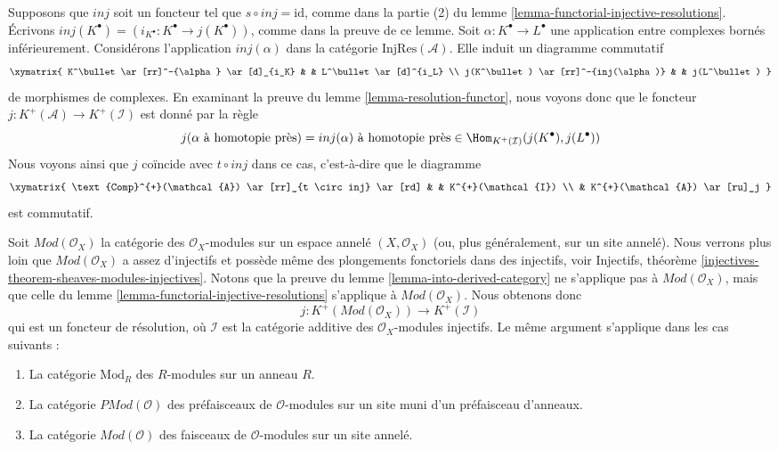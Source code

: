 \begin{remark}
\label{remark-match}
Supposons que $inj$ soit un foncteur tel que $s \circ inj = \text{id}$, comme
dans la partie (2) du lemme
\ref{lemma-functorial-injective-resolutions}.
Écrivons
$inj(K^\bullet) = (i_{K^\bullet} : K^\bullet \to j(K^\bullet))$, comme dans
la preuve de ce lemme.
Soit $\alpha : K^\bullet \to L^\bullet$ une application entre complexes bornés
inférieurement. Considérons l'application $inj(\alpha)$ dans la catégorie
$\text{InjRes}(\mathcal{A})$. Elle induit un diagramme commutatif
$$
\xymatrix{
K^\bullet
\ar[rr]^-{\alpha}
\ar[d]_{i_K} & &
L^\bullet \ar[d]^{i_L} \\
j(K^\bullet)
\ar[rr]^-{inj(\alpha)}
& &
j(L^\bullet)
}
$$
de morphismes de complexes.
En examinant la preuve du lemme \ref{lemma-resolution-functor}, nous voyons
donc que le foncteur
$j : K^{+}(\mathcal{A}) \to K^{+}(\mathcal{I})$ est donné par la règle
$$
j(\alpha\text{ à homotopie près}) =
inj(\alpha)\text{ à homotopie près}\in
\Hom_{K^{+}(\mathcal{I})}(j(K^\bullet), j(L^\bullet))
$$
Nous voyons ainsi que $j$ coïncide avec $t \circ inj$ dans ce cas,
c'est-à-dire que le diagramme
$$
\xymatrix{
\text{Comp}^{+}(\mathcal{A}) \ar[rr]_{t \circ inj} \ar[rd] & &
K^{+}(\mathcal{I}) \\
& K^{+}(\mathcal{A}) \ar[ru]_j
}
$$
est commutatif.
\end{remark}

\begin{remark}
\label{remark-big-abelian-category}
Soit $\textit{Mod}(\mathcal{O}_X)$ la catégorie des
$\mathcal{O}_X$-modules sur un espace annelé $(X, \mathcal{O}_X)$ (ou, plus
généralement, sur un site annelé). Nous verrons plus loin que
$\textit{Mod}(\mathcal{O}_X)$ a assez d'injectifs et possède même des
plongements fonctoriels dans des injectifs, voir Injectifs, théorème
\ref{injectives-theorem-sheaves-modules-injectives}.
Notons que la preuve du lemme \ref{lemma-into-derived-category} ne s'applique
pas à $\textit{Mod}(\mathcal{O}_X)$, mais que celle du
lemme \ref{lemma-functorial-injective-resolutions} s'applique à
$\textit{Mod}(\mathcal{O}_X)$. Nous obtenons donc
$$
j : K^{+}(\textit{Mod}(\mathcal{O}_X))
\longrightarrow
K^{+}(\mathcal{I})
$$
qui est un foncteur de résolution, où $\mathcal{I}$ est la catégorie additive
des $\mathcal{O}_X$-modules injectifs. Le même argument s'applique dans les cas
suivants :
\begin{enumerate}
\item La catégorie $\text{Mod}_R$ des $R$-modules sur un anneau $R$.
\item La catégorie $\textit{PMod}(\mathcal{O})$ des préfaisceaux de
$\mathcal{O}$-modules sur un site muni d'un préfaisceau d'anneaux.
\item La catégorie $\textit{Mod}(\mathcal{O})$ des faisceaux de
$\mathcal{O}$-modules sur un site annelé.
\end{enumerate}
\end{remark}



